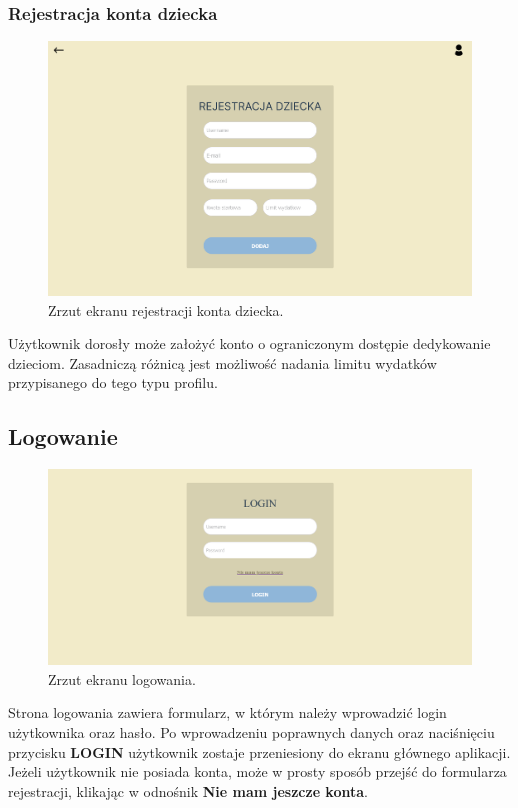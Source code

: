 \documentclass[12pt,a4paper,oneside]{article}
\begin{document}
\subsubsection{Rejestracja konta dziecka}
\begin{figure}[H]
    \centering
    \includegraphics[width=\hsize,keepaspectratio]{images/register_childs_profile.png}
    \caption{Zrzut ekranu rejestracji konta dziecka.}
\end{figure}
Użytkownik dorosły może założyć konto o ograniczonym dostępie dedykowanie
dzieciom. Zasadniczą różnicą jest możliwość nadania limitu wydatków przypisanego
do tego typu profilu.

\subsection{Logowanie}
\begin{figure}[H]
    \centering
    \includegraphics[width=\hsize,keepaspectratio]{images/login.png}
    \caption{Zrzut ekranu logowania.}
\end{figure}
Strona logowania zawiera formularz, w którym należy wprowadzić login użytkownika
oraz hasło. Po wprowadzeniu poprawnych danych oraz naciśnięciu przycisku
\textbf{LOGIN} użytkownik zostaje przeniesiony do ekranu głównego aplikacji.
Jeżeli użytkownik nie posiada konta, może w prosty sposób przejść do formularza
rejestracji, klikając w odnośnik \textbf{Nie mam jeszcze konta}.
\end{document}
